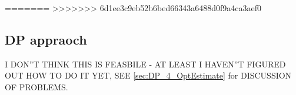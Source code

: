 \documentclass{article}
\begin{document}
\clearpage
















=======
>>>>>>> 6d1ee3c9eb52b6bed66343a6488d0f9a4ca3aef0

\subsection{DP appraoch}
I DON''T THINK THIS IS FEASBILE - AT LEAST I HAVEN''T FIGURED OUT HOW TO DO IT
YET, SEE \cref{sec:DP_4_OptEstimate} for DISCUSSION OF PROBLEMS.

% 
% 
%  
%  
% 
% 
% 
% 
\end{document}
